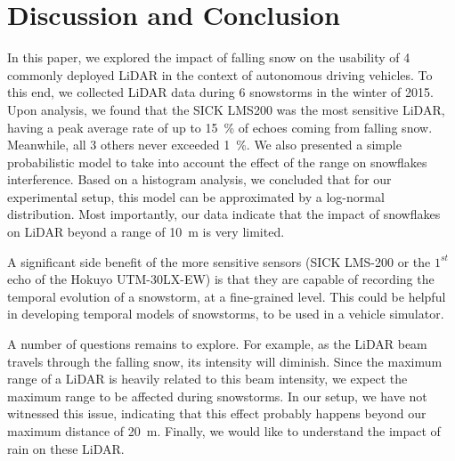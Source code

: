 \section{Discussion and Conclusion}

In this paper, we explored the impact of falling snow on the usability of 4 commonly deployed LiDAR in the context of autonomous driving vehicles. To this end, we collected LiDAR data during 6 snowstorms in the winter of 2015. Upon analysis, we found that the SICK LMS200 was the most sensitive LiDAR, having a peak average rate of up to 15~\% of echoes coming from falling snow. Meanwhile, all 3 others never exceeded 1~\%. We also presented a simple probabilistic model to take into account the effect of the range on snowflakes interference. Based on a histogram analysis, we concluded that for our experimental setup, this model can be approximated by a log-normal distribution. Most importantly, our data indicate that the impact of snowflakes on LiDAR beyond a range of \SI{10}{\meter} is very limited. 

A significant side benefit of the more sensitive sensors (SICK LMS-200 or the $1^{st}$ echo of the Hokuyo UTM-30LX-EW) is that they are capable of recording the temporal evolution of a snowstorm, at a fine-grained level. This could be helpful in developing temporal models of snowstorms, to be used in a vehicle simulator.

A number of questions remains to explore. For example, as the LiDAR beam travels through the falling snow, its intensity will diminish. Since the maximum range of a LiDAR is heavily related to this beam intensity, we expect the maximum range to be affected during snowstorms. In our setup, we have not witnessed this issue, indicating that this effect probably happens beyond our maximum distance of \SI{20}{\meter}. Finally, we would like to understand the impact of rain on these LiDAR. 

